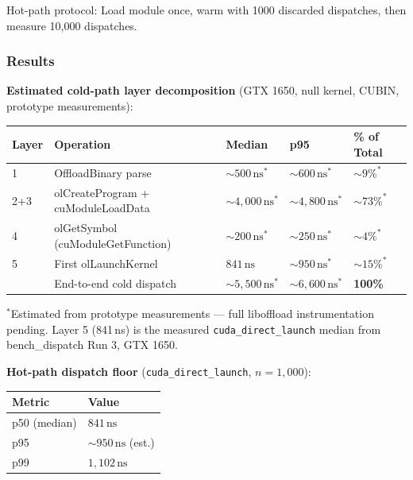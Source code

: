 \documentclass[11pt]{article}
\begin{document}
Hot-path protocol:
Load module once, warm with 1000 discarded dispatches, then measure 10,000 dispatches.

\subsubsection{Results}

\textbf{Estimated cold-path layer decomposition} (GTX 1650, null kernel, CUBIN, prototype measurements):

\begin{center}
\begin{tabular}{lllll}
  \toprule
  Layer & Operation & Median & p95 & \% of Total \\
  \midrule
  1 & OffloadBinary parse & ${\sim}500\,\text{ns}^{*}$ & ${\sim}600\,\text{ns}^{*}$ & ${\sim}9\%^{*}$ \\
  2+3 & olCreateProgram + cuModuleLoadData & ${\sim}4{,}000\,\text{ns}^{*}$ & ${\sim}4{,}800\,\text{ns}^{*}$ & ${\sim}73\%^{*}$ \\
  4 & olGetSymbol (cuModuleGetFunction) & ${\sim}200\,\text{ns}^{*}$ & ${\sim}250\,\text{ns}^{*}$ & ${\sim}4\%^{*}$ \\
  5 & First olLaunchKernel & $841\,\text{ns}$ & ${\sim}950\,\text{ns}^{*}$ & ${\sim}15\%^{*}$ \\
  \midrule
  & End-to-end cold dispatch & ${\sim}5{,}500\,\text{ns}^{*}$ & ${\sim}6{,}600\,\text{ns}^{*}$ & \textbf{100\%} \\
  \bottomrule
\end{tabular}
\end{center}
\footnotesize{$^{*}$Estimated from prototype measurements --- full liboffload instrumentation pending.
Layer 5 (841\,ns) is the measured \texttt{cuda\_direct\_launch} median from bench\_dispatch Run 3, GTX 1650.}\normalsize

\textbf{Hot-path dispatch floor} (\texttt{cuda\_direct\_launch}, \(n=1{,}000\)):

\begin{center}
\begin{tabular}{ll}
  \toprule
  Metric & Value \\
  \midrule
  p50 (median) & $841\,\text{ns}$ \\
  p95 & ${\sim}950\,\text{ns}$ (est.) \\
  p99 & $1{,}102\,\text{ns}$ \\
  \bottomrule
\end{tabular}
\end{center}
\end{document}
